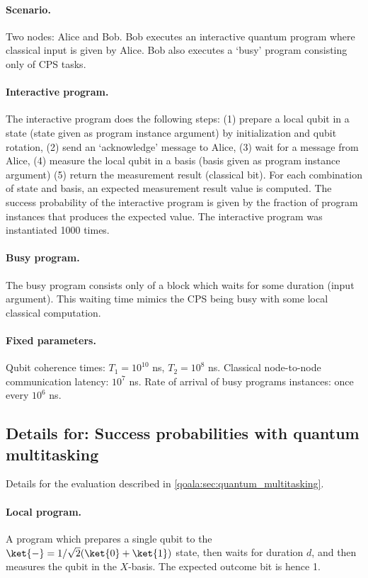 \paragraph{Scenario.}
Two nodes: Alice and Bob.
Bob executes an interactive quantum program where classical input is given by Alice.
Bob also executes a `busy' program consisting only of CPS tasks.

\paragraph{Interactive program.}
The interactive program does the following steps:
(1) prepare a local qubit in a state (state given as program instance argument) by initialization and qubit rotation,
(2) send an `acknowledge' message to Alice,
(3) wait for a message from Alice,
(4) measure the local qubit in a basis (basis given as program instance argument)
(5) return the measurement result (classical bit).
For each combination of state and basis, an expected measurement result value is computed.
The success probability of the interactive program is given by the fraction of program instances that produces the expected value.
The interactive program was instantiated 1000 times.

\paragraph{Busy program.}
The busy program consists only of a block which waits for some duration (input argument).
This waiting time mimics the CPS being busy with some local classical computation.

\paragraph{Fixed parameters.}
Qubit coherence times: $T_1 = 10^{10}$ ns, $T_2 = 10^8$ ns.
Classical node-to-node communication latency: $10^7$ ns.
Rate of arrival of busy programs instances: once every $10^6$ ns.


\subsection{Details for: Success probabilities with quantum multitasking}
Details for the evaluation described in \cref{qoala:sec:quantum_multitasking}.

\paragraph{Local program.}
A program which prepares a single qubit to the $\ket{-} = 1/\sqrt{2} (\ket{0} + \ket{1})$ state, then waits for duration $d$, and then measures the qubit in the $X$-basis. The expected outcome bit is hence 1.

